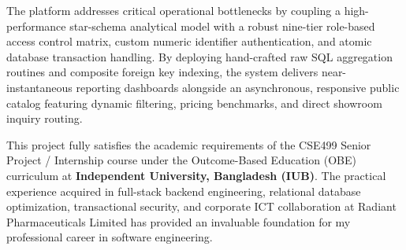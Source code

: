 The platform addresses critical operational bottlenecks by coupling a high-performance star-schema analytical model with a robust nine-tier role-based access control matrix, custom numeric identifier authentication, and atomic database transaction handling. By deploying hand-crafted raw SQL aggregation routines and composite foreign key indexing, the system delivers near-instantaneous reporting dashboards alongside an asynchronous, responsive public catalog featuring dynamic filtering, pricing benchmarks, and direct showroom inquiry routing.

This project fully satisfies the academic requirements of the CSE499 Senior Project / Internship course under the Outcome-Based Education (OBE) curriculum at \textbf{Independent University, Bangladesh (IUB)}. The practical experience acquired in full-stack backend engineering, relational database optimization, transactional security, and corporate ICT collaboration at Radiant Pharmaceuticals Limited has provided an invaluable foundation for my professional career in software engineering.
